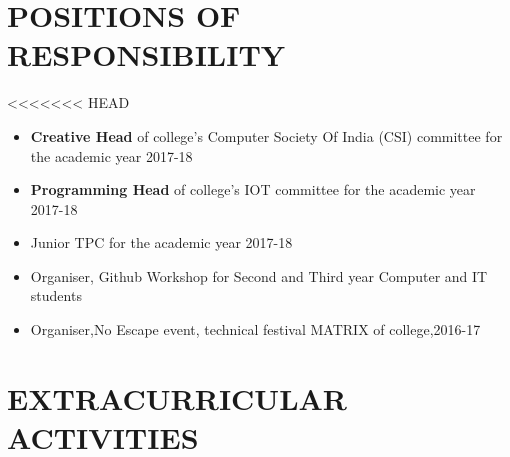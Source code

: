 \documentclass[11pt]{article} %
\newcommand{\NewPart}[1]{\section*{\uppercase{#1}}}
\begin{document}
\NewPart{  Positions of Responsibility}{}

<<<<<<< HEAD
\begin{itemize}
\itemsep-0.5em 
\item \textbf{Creative Head} of college’s Computer Society Of India (CSI) committee for the academic year 2017-18
\item \textbf{Programming Head} of college’s IOT committee for the academic year 2017-18
\item Junior TPC for the academic year 2017-18
\item Organiser, Github Workshop for Second and Third year Computer and IT students 
\item Organiser,No Escape event, technical festival MATRIX of college,2016-17 
\end{itemize}
\NewPart{  Extracurricular Activities}{}
\end{document}

